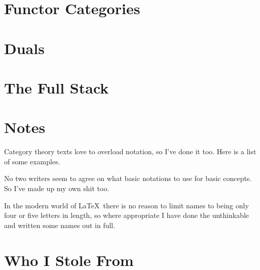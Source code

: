 \documentclass[12pt]{article}
\theoremstyle{definition}
\theoremstyle{definition}
\theoremstyle{definition}
\numberwithin{equation}{section}
\begin{document}
\section{Functor Categories}

\section{Duals}

\section{The Full Stack}

\section{Notes}

Category theory texts love to overload notation, so I've done it too. Here is a list of some examples.

No two writers seem to agree on what basic notations to use for basic concepts. So I've made up my own shit too.

In the modern world of \LaTeX\ there is no reason to limit names to being only four or five letters in length, so where appropriate I have done the unthinkable and written some names out in full.

\section{Who I Stole From}
\end{document}
